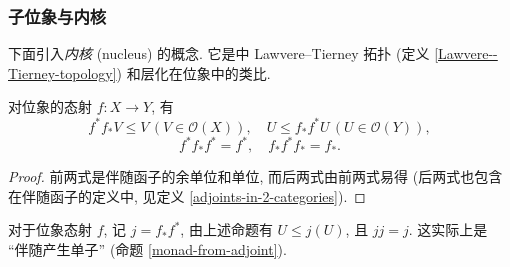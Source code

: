 %
%
%
%
%
%
%

\newcommand{\nc}{内核}

\subsubsection{子位象与\nc{}}

下面引入\emph{\nc{}} (nucleus) 的概念. 它是\topos{}中 Lawvere--Tierney 拓扑 (定义 \ref{Lawvere--Tierney-topology}) 和层化在位象中的类比.

\begin{prop}
	[label={locale-map-triangular-identities}]
	{}
	对位象的态射 $f\colon X\to Y$, 有
	\[
	f^*f_*V \leq V\,(V\in\mathcal O(X)),\quad U\leq f_*f^* U\,(U\in\mathcal O(Y)),
	\]
	\[
	f^*f_*f^* = f^*,\quad
	f_*f^*f_* = f_*.
	\]
\end{prop}
\begin{proof}
	前两式是伴随函子的余单位和单位, 而后两式由前两式易得 (后两式也包含在伴随函子的定义中, 见定义 \ref{adjoints-in-2-categories}).
\end{proof}
对于位象态射 $f$, 记 $j = f_*f^*$, 由上述命题有 $U\leq j(U)$, 且 $jj=j$. 这实际上是 ``伴随产生单子'' (命题 \ref{monad-from-adjoint}).

